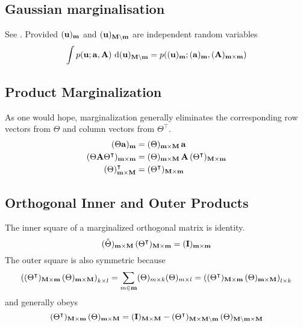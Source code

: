 \documentclass[a4paper, margin=1in, reqno]{RAMArticle}
\begin{document}
	\subsection{Gaussian marginalisation}\label{sub:App:GM}
		See \cite{Roweis1999,Rasmussen2016,Schoen.Lindsten2018}.
		Provided \((\mathbf{u})_{\mathbf{m}}\) and \((\mathbf{u})_{\mathbf{M}\setminus\mathbf{m}}\) are independent random variables
		\begin{equation*}
			\int p\!\left( \mathbf{u} ; \mathbf{a},\mathbf{A} \right) \, \mathrm{d} (\mathbf{u})_{\mathbf{M}\setminus\mathbf{m}}
				= p\!\left((\mathbf{u})_{\mathbf{m}} ; (\mathbf{a})_{\mathbf{m}},(\mathbf{A})_{\mathbf{m}\times\mathbf{m}}\right)
		\end{equation*}

	\subsection{Product Marginalization}\label{sub:App:PM}
		As one would hope, marginalization generally eliminates the corresponding row vectors from \(\Theta\) and column vectors from \(\Theta^{\intercal}\).
		\begin{align*}
			(\Theta\mathbf{a})_{\mathbf{m}} &= 
			(\Theta)_{\mathbf{m}\times\mathbf{M}}\,\mathbf{a} \\
			(\Theta\mathbf{A}\Theta^{\intercal})_{\mathbf{m}\times\mathbf{m}} &= 
			(\Theta)_{\mathbf{m}\times\mathbf{M}}\,\mathbf{A}\,(\Theta^{\intercal})_{\mathbf{M}\times\mathbf{m}} \\
			(\Theta)_{\mathbf{m}\times\mathbf{M}}^{\intercal} &= 
			(\Theta^{\intercal})_{\mathbf{M}\times\mathbf{m}}
		\end{align*}

	\subsection{Orthogonal Inner and Outer Products}\label{sub:App:OIOP}
		The inner square of a marginalized orthogonal matrix is identity.
		\begin{equation*}
			(\hat{\Theta})_{\mathbf{m}\times\mathbf{M}}\,(\Theta^{\intercal})_{\mathbf{M}\times\mathbf{m}} = 
			(\mathbf{I})_{\mathbf{m}\times\mathbf{m}}
		\end{equation*}
		The outer square is also symmetric because
		\begin{equation*}
			\left((\Theta^{\intercal})_{\mathbf{M}\times\mathbf{m}}\,(\Theta)_{\mathbf{m}\times\mathbf{M}}\right)_{k \times l} = 
			\sum_{m\in\mathbf{m}} (\Theta)_{m \times k}(\Theta)_{m \times l} = 
			\left((\Theta^{\intercal})_{\mathbf{M}\times\mathbf{m}}\,(\Theta)_{\mathbf{m}\times\mathbf{M}}\right)_{l \times k}
		\end{equation*}
		and generally obeys
		\begin{equation*}
			(\Theta^{\intercal})_{\mathbf{M}\times\mathbf{m}}\,(\Theta)_{\mathbf{m}\times\mathbf{M}} = 
			(\mathbf{I})_{\mathbf{M}\times\mathbf{M}} -
			(\Theta^{\intercal})_{\mathbf{M}\times\mathbf{M}\setminus\mathbf{m}}\,(\Theta)_{\mathbf{M}\setminus\mathbf{m}\times\mathbf{M}}
		\end{equation*}
\end{document}
